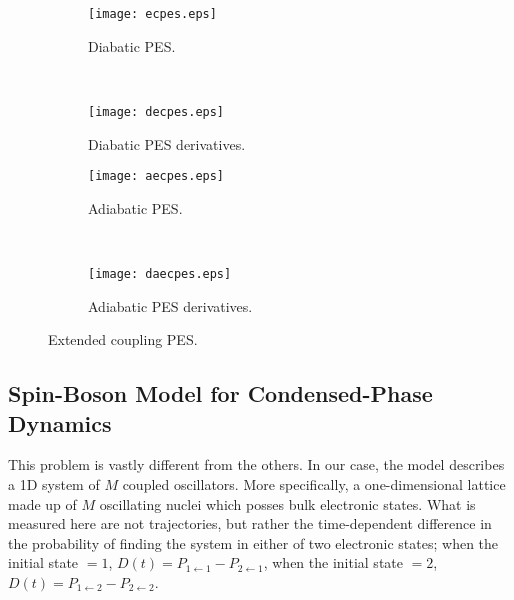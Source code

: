 \begin{figure}
\centering
\begin{subfigure}[t]{0.485\textwidth}
\centering
\texttt{[image: ecpes.eps]}
\caption[]{Diabatic PES.}
\label{sumf:pesec}
\end{subfigure}
~
\begin{subfigure}[t]{0.485\textwidth}
\centering
\texttt{[image: decpes.eps]}
\caption[]{Diabatic PES derivatives.}
\label{sumf:dpesec}
\end{subfigure}

\begin{subfigure}[t]{0.485\textwidth}
\centering
\texttt{[image: aecpes.eps]}
\caption[]{Adiabatic PES.}
\label{sumf:apesec}
\end{subfigure}
~
\begin{subfigure}[t]{0.485\textwidth}
\centering
\texttt{[image: daecpes.eps]}
\caption[]{Adiabatic PES derivatives.}
\label{sumf:dapesec}
\end{subfigure}
\caption[]{Extended coupling PES.}\label{sumf:ecpes}
\end{figure}
%
\subsection*{Spin-Boson Model for Condensed-Phase Dynamics}\label{sumsb:sb}
%
This problem is vastly different from the others. In our case, the model describes a 1D system of $ M $ coupled oscillators. More specifically, a one-dimensional lattice made up of $ M $ oscillating nuclei which posses bulk electronic states. What is measured here are not trajectories, but rather the time-dependent difference in the probability of finding the system in either of two electronic states; when the initial state $ =1 $, $ D(t) = P_{1\leftarrow 1} - P_{2\leftarrow 1}$, when the initial state $ =2 $, $ D(t) = P_{1\leftarrow 2} - P_{2\leftarrow 2}$.


